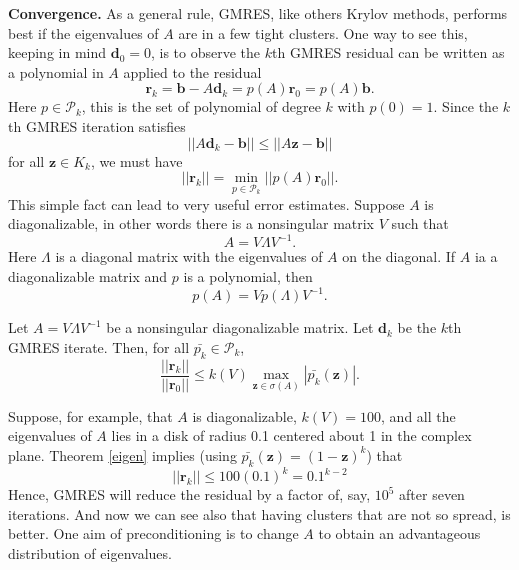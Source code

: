 \noindent \textbf{Convergence.} As a general rule, GMRES, like others Krylov methods, performs best if the eigenvalues of $A$ are in a few tight clusters. One way to see this, keeping in mind $\textbf{d}_0=0$, is to observe the $k$th GMRES residual can be written as a polynomial in $A$ applied to the residual
\begin{equation*}
\textbf{r}_k=\textbf{b}-A\textbf{d}_k=p(A)\textbf{r}_0=p(A)\textbf{b}.
\end{equation*}
  Here $p\in \mathcal{P}_k$, this is the set of polynomial of degree $k$ with $p(0)=1$. Since the $k$th GMRES iteration satisfies 
  \begin{equation*}
  ||A\textbf{d}_k-\textbf{b} ||\leq ||A\textbf{z}-\textbf{b}||
  \end{equation*}
  for all $\textbf{z}\in\mathit{K_k}$, we must have 
  \begin{equation*}
  ||\textbf{r}_k||=\min_{p\in \mathcal{P}_k}||p(A)\textbf{r}_0 ||.
  \end{equation*}
  This simple fact can lead to very useful error estimates.
  Suppose $A$ is diagonalizable, in other words there is a nonsingular matrix $V$ such that 
   \begin{equation*}
   A=V\Lambda V^{-1}.
   \end{equation*}
   Here $\Lambda$ is a diagonal matrix with the eigenvalues of $A$ on the diagonal. If $A$ ia a diagonalizable matrix and $p$ is a polynomial, then 
   \begin{equation*}
   p(A)=Vp(\Lambda) V^{-1}.
   \end{equation*}
   \begin{theorem}
   	\label{eigen}
   	Let $A=V\Lambda V^{-1}$ be a nonsingular diagonalizable matrix. Let $\textbf{d}_k$ be the $k$th GMRES iterate. Then, for all $\bar{p_k}\in \mathcal{P}_k$,
   	\begin{equation*}
   	\frac{||\textbf{r}_k||}{||\textbf{r}_0||}\leq \mathit{k}(V) \max_{\textbf{z}\in \sigma(A)}|\bar{p_k}(\textbf{z})|.
   	\end{equation*}
   \end{theorem}
   
   Suppose, for example, that $A$ is diagonalizable, $\mathit{k}(V) = 100$, and all the eigenvalues of $A$ lies in a disk of radius 0.1 centered about 1 in the complex plane. Theorem \ref{eigen} implies (using $\bar{p_k}(\textbf{z})=(1-\textbf{z})^k$) that
   \begin{equation*}
   ||\textbf{r}_k||\leq 100(0.1)^k =0.1^{k-2}
   \end{equation*}
   Hence, GMRES will reduce the residual by a factor of, say, $10^5$ after seven iterations. And now we can see also that having clusters that are not so spread, is better. One aim of preconditioning is to change $A$ to obtain an advantageous distribution of eigenvalues.\\
   
